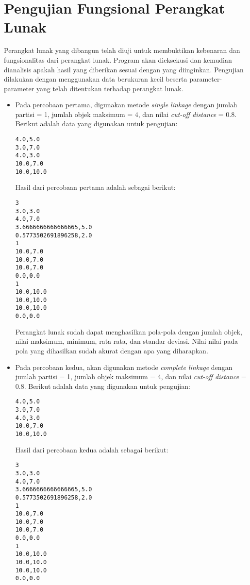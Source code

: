 \section{Pengujian Fungsional Perangkat Lunak}

Perangkat lunak yang dibangun telah diuji untuk membuktikan kebenaran dan fungsionalitas dari perangkat lunak. Program akan dieksekusi dan kemudian dianalisis apakah hasil yang diberikan sesuai dengan yang diinginkan. Pengujian dilakukan dengan menggunakan data berukuran kecil beserta parameter-parameter yang telah ditentukan terhadap perangkat lunak.

\begin{itemize}

\item Pada percobaan pertama, digunakan metode \textit{single linkage} dengan jumlah partisi = 1, jumlah objek maksimum = 4, dan nilai \textit{cut-off distance} = 0.8. Berikut adalah data yang digunakan untuk pengujian:

\begin{verbatim}
4.0,5.0
3.0,7.0
4.0,3.0
10.0,7.0
10.0,10.0
\end{verbatim}

Hasil dari percobaan pertama adalah sebagai berikut:

\begin{verbatim}
3
3.0,3.0
4.0,7.0
3.6666666666666665,5.0
0.5773502691896258,2.0
1
10.0,7.0
10.0,7.0
10.0,7.0
0.0,0.0
1
10.0,10.0
10.0,10.0
10.0,10.0
0.0,0.0
\end{verbatim}

Perangkat lunak sudah dapat menghasilkan pola-pola dengan jumlah objek, nilai maksimum, minimum, rata-rata, dan standar deviasi. Nilai-nilai pada pola yang dihasilkan sudah akurat dengan apa yang diharapkan.

\item Pada percobaan kedua, akan digunakan metode \textit{complete linkage} dengan jumlah partisi = 1, jumlah objek maksimum = 4, dan nilai \textit{cut-off distance} = 0.8. Berikut adalah data yang digunakan untuk pengujian:

\begin{verbatim}
4.0,5.0
3.0,7.0
4.0,3.0
10.0,7.0
10.0,10.0
\end{verbatim}

Hasil dari percobaan kedua adalah sebagai berikut:

\begin{verbatim}
3
3.0,3.0
4.0,7.0
3.6666666666666665,5.0
0.5773502691896258,2.0
1
10.0,7.0
10.0,7.0
10.0,7.0
0.0,0.0
1
10.0,10.0
10.0,10.0
10.0,10.0
0.0,0.0
\end{verbatim}


\end{itemize}
